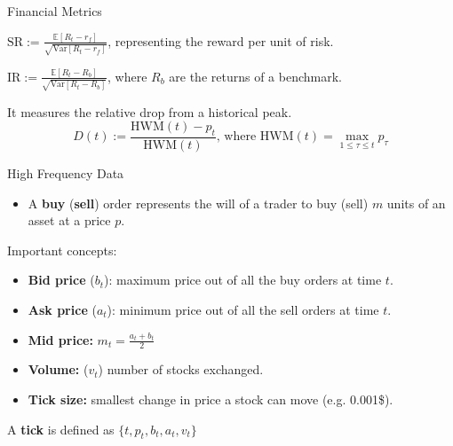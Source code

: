 \documentclass{beamer} %
\begin{document}
\begin{frame}{Financial Metrics}

\begin{block}{}
	\begin{center}
		$\text{SR} := \frac{\mathbb{E}[R_t - r_f]}{\sqrt{\text{Var}[R_t - 
		r_f]}}$, representing the reward per unit of risk.
	\end{center}
\end{block}

\begin{block}{}
	\begin{center}
		$\text{IR} := \frac{\mathbb{E}[R_t - R_b]}{\sqrt{\text{Var}[R_t - 	
		R_b]}}$, where $R_b$ are the returns of a benchmark.
	\end{center}
\end{block}

\begin{block}{}
	\begin{center}
		It measures the relative drop from a historical peak.
		\vspace{-.15cm}
		\begin{equation*} 
			D(t) := \frac{\text{HWM}(t) - p_t}{\text{HWM}(t)} \text{, where } 
			\text{HWM}(t) = \max_{1 \leq \tau \leq t} p_{\tau}
		\end{equation*}
	\end{center}
\end{block}

\end{frame}

\begin{frame}{High Frequency Data}
	\vfill
	\begin{itemize}
		\item A \textbf{buy} (\textbf{sell}) order represents the will of a 
		trader to buy (sell) $m$ units of an asset at a price $p$.
	\end{itemize}

	\vfill
	Important concepts:
	\begin{itemize}
		\item \textbf{Bid price} ($b_t$): maximum price out of all the buy 
		orders at time $t$.
		
		\item \textbf{Ask price} ($a_t$): minimum price out of all the sell 
		orders at time $t$.
		
		\item \textbf{Mid price:} $m_t = \frac{a_t + b_t}{2}$
		
		
		\item \textbf{Volume:} ($v_t$) number of stocks exchanged.
		
		\item \textbf{Tick size:} smallest change in price a stock can move 
		(e.g. 0.001\$).
	\end{itemize}
	
	\vfill
	A \textbf{tick} is defined as $\{t, p_t, b_t, a_t, v_t \}$
	
	\vfill
\end{frame}
\end{document}
